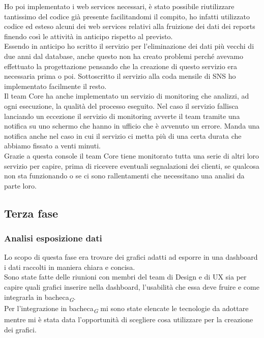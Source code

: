 \documentclass[a4paper, 12pt, twoside, openright]{book}
\newcommand{\gloss}[1]{#1\textsubscript{\textit{\tiny{G}}}}
\begin{document}
Ho poi implementato i web services necessari, è stato possibile riutilizzare tantissimo del codice già presente facilitandomi il compito, ho infatti utilizzato codice ed esteso alcuni dei web services relativi alla fruizione dei dati dei reports finendo così le attività in anticipo rispetto al previsto.\\
Essendo in anticipo ho scritto il servizio per l'eliminazione dei dati più vecchi di due anni dal database, anche questo non ha creato problemi perché avevamo effettuato la progettazione pensando che la creazione di questo servizio era necessaria prima o poi. Sottoscritto il servizio alla coda mensile di SNS ho implementato facilmente il resto.\\

Il team Core ha anche implementato un servizio di monitoring che analizzi, ad ogni esecuzione, la qualità del processo eseguito. Nel caso il servizio fallisca lanciando un eccezione il servizio di monitoring avverte il team tramite una notifica su uno schermo che hanno in ufficio che è avvenuto un errore. Manda una notifica anche nel caso in cui il servizio ci metta più di una certa durata che abbiamo fissato a venti minuti.\\
Grazie a questa console il team Core tiene monitorato tutta una serie di altri loro servizio per capire, prima di ricevere eventuali segnalazioni dei clienti, se qualcosa non sta funzionando o se ci sono rallentamenti che necessitano una analisi da parte loro.\\

\subsection{Terza fase}

\subsubsection{Analisi esposizione dati}
Lo scopo di questa fase era trovare dei grafici adatti ad esporre in una dashboard i dati raccolti in maniera chiara e concisa.\\
Sono state fatte delle riunioni con membri del team di Design e di UX sia per capire quali grafici inserire nella dashboard, l'usabilità che essa deve fruire e come integrarla in \gloss{bacheca}.\\
Per l'integrazione in \gloss{bacheca} mi sono state elencate le tecnologie da adottare mentre mi è stata data l'opportunità di scegliere cosa utilizzare per la creazione dei grafici.\\
\end{document}
